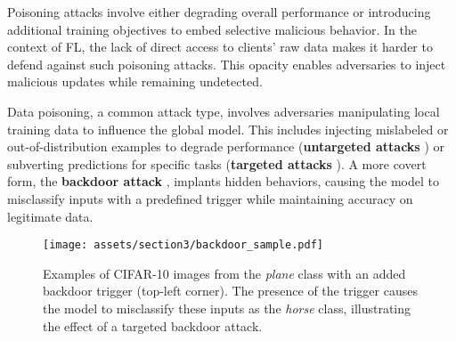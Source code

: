 


Poisoning attacks involve either degrading overall performance or introducing additional training objectives to  embed selective malicious behavior. In the context of FL, the lack of direct access to clients' raw data makes it harder to defend against such poisoning attacks. This opacity enables adversaries to inject malicious updates while remaining undetected.

Data poisoning, a common attack type, involves adversaries manipulating local training data to influence the global model. This includes injecting mislabeled or out-of-distribution examples to degrade performance (\textbf{untargeted attacks} \citep{biggio2013poisoningattackssupportvector, jagielski_manipulating, Mei_Zhu_2015, xiao_feature_selection, shejwalkar2021manipulating, fangbyzantinerobust}) or subverting predictions for specific tasks (\textbf{targeted attacks} \citep{koh_black_box, shafahi_poison_frogs, suciu_fail}). A more covert form, the \textbf{backdoor attack} \citep{gu_badnets, bagdasaryan_howto, attacktails, sun2019reallybackdoorfederatedlearning}, implants hidden behaviors, causing the model to misclassify inputs with a predefined trigger while maintaining accuracy on legitimate data.
\begin{figure}[h]
    \centering
    \texttt{[image: assets/section3/backdoor\_sample.pdf]}
    \caption{Examples of CIFAR-10 images from the \textit{plane} class with an added backdoor trigger (top-left corner). The presence of the trigger causes the model to misclassify these inputs as the \textit{horse} class, illustrating the effect of a targeted backdoor attack.}
    \label{fig:backdoor_samples}
\end{figure}

